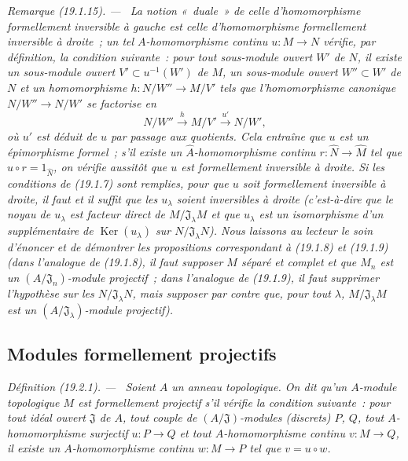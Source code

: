 \documentclass[10pt,oneside]{book}
\makeatletter
\newcommand{\setmanualcurrentlabel}[1]{\def\@currentlabel{#1}}
\newenvironment{definition}[1][]{%
  \setmanualcurrentlabel{#1}\par\medskip\noindent\itshape Définition (#1). ---\ }{\par}
\newenvironment{remark}[1][]{%
  \setmanualcurrentlabel{#1}\par\medskip\noindent\itshape Remarque (#1). ---\ }{\par}
\makeatother
\begin{document}
\begin{remark}[19.1.15]
\label{0.19.1.15-fr}
La notion «~duale~» de celle d'homomorphisme formellement inversible à gauche
est celle d'homomorphisme \emph{formellement inversible à droite}~; un tel
$A$-homomorphisme continu $u:M\to N$ vérifie, par définition, la condition
suivante~: pour tout sous-module ouvert $W'$ de $N$, il existe un sous-module
ouvert $V'\subset u^{-1}(W')$ de $M$, un sous-module ouvert $W''\subset W'$ de
$N$ et un homomorphisme $h:N/W''\to M/V'$ tels que l'homomorphisme canonique
$N/W''\to N/W'$ se factorise en
\[
  N/W''\xrightarrow{h}M/V'\xrightarrow{u'}N/W',
\]
où $u'$ est déduit de $u$ par passage aux quotients. Cela entraîne que $u$ est
un épimorphisme formel~; s'il existe un $\widehat A$-homomorphisme continu
$r:\widehat N\to\widehat M$ tel que $\widehat u\circ r=1_{\widehat N}$, on
vérifie aussitôt que $u$ est formellement inversible à droite. Si les
conditions de (19.1.7) sont remplies, pour que $u$ soit formellement inversible
à droite, il faut et il suffit que les $u_\lambda$ soient inversibles à droite
(c'est-à-dire que le noyau de $u_\lambda$ est facteur direct de
$M/\mathfrak J_\lambda M$ et que $u_\lambda$ est un isomorphisme d'un
supplémentaire de $\operatorname{Ker}(u_\lambda)$ sur
$N/\mathfrak J_\lambda N$). Nous laissons au lecteur le soin d'énoncer et de
démontrer les propositions correspondant à (19.1.8) et (19.1.9) (dans
l'analogue de (19.1.8), il faut supposer $M$ séparé et complet et que $M_n$ est
un $(A/\mathfrak J_n)$-module projectif~; dans l'analogue de (19.1.9), il faut
supprimer l'hypothèse sur les $N/\mathfrak J_\lambda N$, mais supposer par
contre que, pour tout $\lambda$, $M/\mathfrak J_\lambda M$ est un
$(A/\mathfrak J_\lambda)$-module projectif).
\end{remark}

\subsection{Modules formellement projectifs}
\label{subsection:0.19.2-fr}

\begin{definition}[19.2.1]
\label{0.19.2.1-fr}
Soient $A$ un anneau topologique. On dit qu'un $A$-module topologique $M$ est
\emph{formellement projectif} s'il vérifie la condition suivante~: pour tout
idéal ouvert $\mathfrak J$ de $A$, tout couple de $(A/\mathfrak J)$-modules
(discrets) $P$, $Q$, tout $A$-homomorphisme surjectif $u:P\to Q$ et tout
$A$-homomorphisme continu $v:M\to Q$, il existe un $A$-homomorphisme continu
$w:M\to P$ tel que $v=u\circ w$.
\end{definition}
\end{document}

